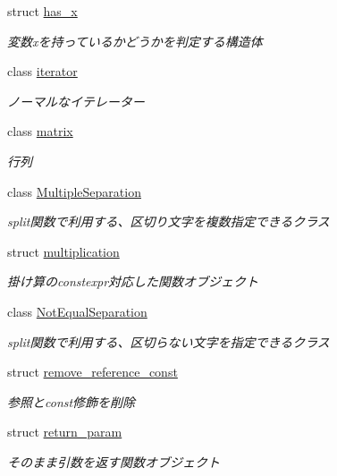 \begin{DoxyCompactItemize}
struct \mbox{\hyperlink{structsaki_1_1has__x}{has\+\_\+x}}
\begin{DoxyCompactList}\small\item\em 変数xを持っているかどうかを判定する構造体 \end{DoxyCompactList}\item 
class \mbox{\hyperlink{classsaki_1_1iterator}{iterator}}
\begin{DoxyCompactList}\small\item\em ノーマルなイテレーター \end{DoxyCompactList}\item 
class \mbox{\hyperlink{classsaki_1_1matrix}{matrix}}
\begin{DoxyCompactList}\small\item\em 行列 \end{DoxyCompactList}\item 
class \mbox{\hyperlink{classsaki_1_1_multiple_separation}{Multiple\+Separation}}
\begin{DoxyCompactList}\small\item\em split関数で利用する、区切り文字を複数指定できるクラス \end{DoxyCompactList}\item 
struct \mbox{\hyperlink{structsaki_1_1multiplication}{multiplication}}
\begin{DoxyCompactList}\small\item\em 掛け算のconstexpr対応した関数オブジェクト \end{DoxyCompactList}\item 
class \mbox{\hyperlink{classsaki_1_1_not_equal_separation}{Not\+Equal\+Separation}}
\begin{DoxyCompactList}\small\item\em split関数で利用する、区切らない文字を指定できるクラス \end{DoxyCompactList}\item 
struct \mbox{\hyperlink{structsaki_1_1remove__reference__const}{remove\+\_\+reference\+\_\+const}}
\begin{DoxyCompactList}\small\item\em 参照とconst修飾を削除 \end{DoxyCompactList}\item 
struct \mbox{\hyperlink{structsaki_1_1return__param}{return\+\_\+param}}
\begin{DoxyCompactList}\small\item\em そのまま引数を返す関数オブジェクト \end{DoxyCompactList}\item 

\end{DoxyCompactItemize}
